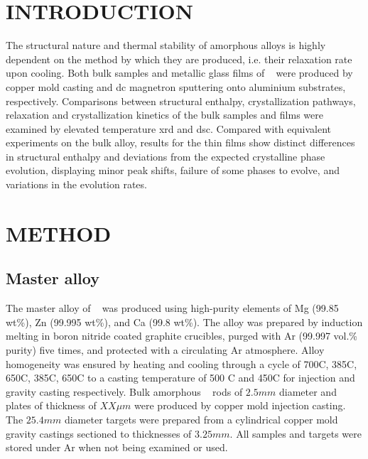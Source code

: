\documentclass[a4paper,12pt,oneside]{article}%
\begin{document}
\newpage
\tableofcontents\newpage
{}
\clearpage %


\section{INTRODUCTION}
\glsresetall

The structural nature and thermal stability of amorphous alloys is highly dependent on the method by which they are produced, i.e. their relaxation rate upon cooling.  Both bulk samples and metallic glass films of \MgZnCa~ were produced by copper mold casting and \gls{dc} magnetron sputtering onto aluminium substrates, respectively. Comparisons between structural enthalpy, crystallization pathways, relaxation and crystallization kinetics of the bulk samples and films were examined by elevated temperature \acrshort{xrd} and \acrshort{dsc}. Compared with equivalent experiments on the bulk alloy, results for the thin films show distinct differences in structural enthalpy and deviations from the expected crystalline phase evolution, displaying minor peak shifts, failure of some phases to evolve, and variations in the evolution rates. 


\section{METHOD}

\subsection{Master alloy}
The master alloy of \MgZnCa~ was produced using high-purity elements of Mg (99.85 wt\%), Zn (99.995 wt\%), and Ca (99.8 wt\%). The alloy was prepared by induction melting in boron nitride coated graphite crucibles, purged with Ar (99.997 vol.\% purity) five times, and protected with a circulating Ar atmosphere. Alloy homogeneity was ensured by heating and cooling through a cycle of 700\degree C, 385\degree C, 650\degree C, 385\degree C, 650\degree C to a casting temperature of 500 \degree C and 450\degree C for injection and gravity casting respectively. Bulk amorphous \MgZnCa~ rods of $2.5 mm$ diameter and plates of thickness of $XX \mu m$ were produced by copper mold injection casting. The $25.4 mm$ diameter targets were prepared from a cylindrical copper mold gravity castings sectioned to thicknesses of $3.25 mm$. All samples and targets were stored under Ar when not being examined or used. 
\end{document}
